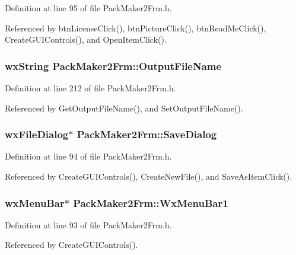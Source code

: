 Definition at line 95 of file Pack\-Maker2Frm.h.

Referenced by btn\-License\-Click(), btn\-Picture\-Click(), btn\-Read\-Me\-Click(), Create\-GUIControls(), and Open\-Item\-Click().
\subsubsection{\setlength{\rightskip}{0pt plus 5cm}wx\-String {\bf Pack\-Maker2Frm::Output\-File\-Name}\hspace{0.3cm}{\tt  [private]}}\label{class_pack_maker2_frm_f7e4c7c6f7a1c747cee152300eed3ccd}




Definition at line 212 of file Pack\-Maker2Frm.h.

Referenced by Get\-Output\-File\-Name(), and Set\-Output\-File\-Name().
\subsubsection{\setlength{\rightskip}{0pt plus 5cm}wx\-File\-Dialog$\ast$ {\bf Pack\-Maker2Frm::Save\-Dialog}\hspace{0.3cm}{\tt  [private]}}\label{class_pack_maker2_frm_167e3bd2b60744a2dcc2cfcc3b309bd3}




Definition at line 94 of file Pack\-Maker2Frm.h.

Referenced by Create\-GUIControls(), Create\-New\-File(), and Save\-As\-Item\-Click().
\subsubsection{\setlength{\rightskip}{0pt plus 5cm}wx\-Menu\-Bar$\ast$ {\bf Pack\-Maker2Frm::Wx\-Menu\-Bar1}\hspace{0.3cm}{\tt  [private]}}\label{class_pack_maker2_frm_6f63693553006476535513e038447a7f}




Definition at line 93 of file Pack\-Maker2Frm.h.

Referenced by Create\-GUIControls().
